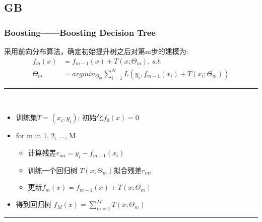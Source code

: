 \documentclass[usenames,dvipsnames]{beamer}
\begin{document}
\subsection{GB}
\begin{frame}
\frametitle{Boosting——Boosting Decision Tree}
采用前向分布算法，确定初始提升树之后对第m步的建模为:
\begin{align*}
  f_m(x) & = f_{m-1}(x) + T(x;\Theta_m), \,s.t. \\
    \hat{\Theta}_m &= argmin_{\Theta_m}\sum_{i=1}^{N}L(y_i, f_{m-1}(x_i)+T(x_i;\Theta_m))
\end{align*}
\noindent\rule[0.10\baselineskip]{\textwidth}{0.75pt}\\
  \begin{itemize}
    \item 训练集$T={(x_i,y_i)}$; 初始化$f_0(x) = 0$
    \item for m in 1, 2, ..., M
      \begin{itemize}
        \item 计算残差$r_{mi} = y_i - f_{m-1}(x_i)$
        \item 训练一个回归树 $T(x;\Theta_m)$拟合残差$r_{mi}$
        \item 更新$f_m(x)  = f_{m-1}(x) + T(x;\Theta_m)$
      \end{itemize}
    \item 得到回归树 $f_M(x) = \sum_{m=1}^{M}T(x;\Theta_m)$
  \end{itemize}
\noindent\rule[0.10\baselineskip]{\textwidth}{0.75pt}\par
\end{frame}
\end{document}
